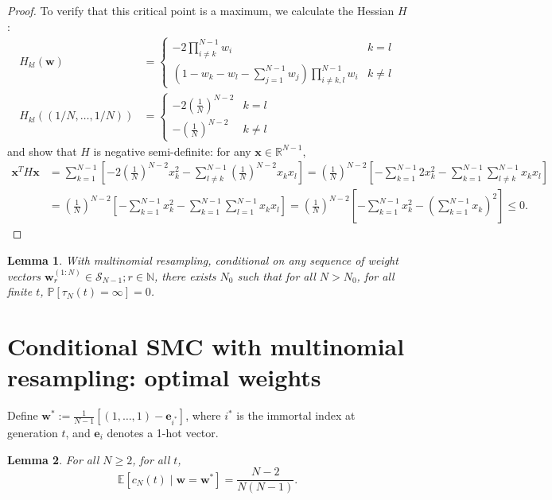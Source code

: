 \documentclass{article}
\newtheorem{lemma}{Lemma}
\newcommand{\PR}{\mathbb{P}}
\newcommand{\E}{\mathbb{E}}
\begin{document}
\begin{proof}
To verify that this critical point is a maximum, we calculate the Hessian $H$:
\begin{align*}
H_{kl}(\mathbf{w})
&= \begin{cases}
-2 \prod_{i\neq k}^{N-1} w_i & k=l \\
\left( 1 - w_k - w_l - \sum_{j=1}^{N-1} w_j \right)\prod_{i\neq k,l}^{N-1}w_i & k\neq l
\end{cases} \\
H_{kl}((1/N, \dots, 1/N))&= \begin{cases}
-2 \left(\frac{1}{N}\right)^{N-2} & k=l \\
- \left(\frac{1}{N}\right)^{N-2} & k\neq l
\end{cases}
\end{align*}
and show that $H$ is negative semi-definite: for any $\mathbf{x} \in \mathbb{R}^{N-1}$,
\begin{align*}
\mathbf{x}^T H \mathbf{x} &= \sum_{k=1}^{N-1} \left[ -2\left(\frac{1}{N}\right)^{N-2} x_k^2
- \sum_{l\neq k}^{N-1} \left(\frac{1}{N}\right)^{N-2} x_k x_l \right] 
= \left(\frac{1}{N}\right)^{N-2} \left[ -\sum_{k=1}^{N-1} 2x_k^2 - \sum_{k=1}^{N-1} \sum_{l\neq k}^{N-1} x_k x_l \right] \\
&= \left(\frac{1}{N}\right)^{N-2} \left[ -\sum_{k=1}^{N-1} x_k^2 - \sum_{k=1}^{N-1} \sum_{l=1}^{N-1} x_k x_l \right]
= \left(\frac{1}{N}\right)^{N-2} \left[ - \sum_{k=1}^{N-1} x_k^2 - \left(\sum_{k=1}^{N-1} x_k \right)^2 \right]
\leq 0 .
\end{align*}
\end{proof}

\begin{lemma}
With multinomial resampling, conditional on any sequence of weight vectors $\mathbf{w}_r^{(1:N)} \in \mathcal{S}_{N-1}; r\in\mathbb{N}$, there exists $N_0$ such that for all $N>N_0$, for all finite $t$, $\PR[\tau_N(t) = \infty] =0$.
\end{lemma}


\section*{Conditional SMC with multinomial resampling: optimal weights}

Define $\mathbf{w}^* := \frac{1}{N-1} \left[ (1,\dots,1) - \mathbf{e}_{i^*} \right]$, where $i^*$ is the immortal index at generation $t$, and $\mathbf{e}_i$ denotes a 1-hot vector.
 
\begin{lemma}
For all $N\geq 2$, for all $t$,
\begin{equation*}
\E \left[c_N(t) \mid \mathbf{w}=\mathbf{w}^* \right]
= \frac{N-2}{N(N-1)} .
\end{equation*}
\end{lemma}
\end{document}
